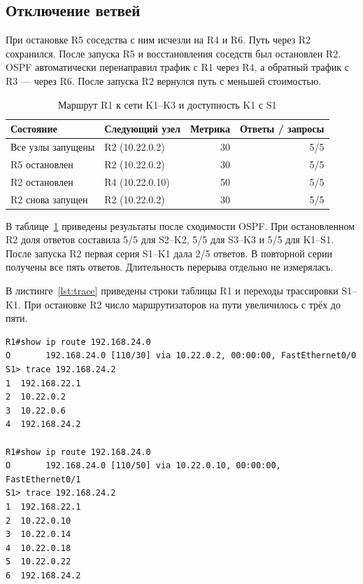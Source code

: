 \documentclass[a4paper,14pt]{extarticle}
\begin{document}
\clearpage
\subsection{Отключение ветвей}

При остановке R5 соседства с ним исчезли на R4 и R6. Путь через R2
сохранился. После запуска R5 и восстановления соседств был остановлен
R2. OSPF автоматически перенаправил трафик с R1 через R4, а обратный
трафик с R3 --- через R6. После запуска R2 вернулся путь с меньшей
стоимостью.

\begin{table}[htbp]
  \centering\small
  \caption{Маршрут R1 к сети K1--K3 и доступность K1 с S1}
  \label{tab:failover}
  \begin{tabularx}{\linewidth}{@{}Xlrr@{}}
    \toprule
    Состояние & Следующий узел & Метрика & Ответы / запросы \\
    \midrule
    Все узлы запущены   & R2 (10.22.0.2)  & 30 & 5/5 \\
    R5 остановлен       & R2 (10.22.0.2)  & 30 & 5/5 \\
    R2 остановлен       & R4 (10.22.0.10) & 50 & 5/5 \\
    R2 снова запущен    & R2 (10.22.0.2)  & 30 & 5/5 \\
    \bottomrule
  \end{tabularx}
\end{table}

В таблице~\ref{tab:failover} приведены результаты после сходимости
OSPF. При остановленном R2 доля ответов составила 5/5 для S2--K2,
5/5 для S3--K3 и 5/5 для K1--S1. После запуска
R2 первая серия S1--K1 дала 2/5 ответов. В повторной серии
получены все пять ответов. Длительность перерыва отдельно не измерялась.

В листинге~\ref{lst:trace} приведены строки таблицы R1 и переходы
трассировки S1--K1. При остановке R2 число маршрутизаторов на пути
увеличилось с трёх до пяти.

{\singlespacing
\begin{lstlisting}[caption={Маршрут R1 и переходы трассировки до и после остановки R2},label={lst:trace},basicstyle=\ttfamily\footnotesize]
R1#show ip route 192.168.24.0
O       192.168.24.0 [110/30] via 10.22.0.2, 00:00:00, FastEthernet0/0
S1> trace 192.168.24.2
1  192.168.22.1
2  10.22.0.2
3  10.22.0.6
4  192.168.24.2

R1#show ip route 192.168.24.0
O       192.168.24.0 [110/50] via 10.22.0.10, 00:00:00, FastEthernet0/1
S1> trace 192.168.24.2
1  192.168.22.1
2  10.22.0.10
3  10.22.0.14
4  10.22.0.18
5  10.22.0.22
6  192.168.24.2
\end{lstlisting}
}
\end{document}

